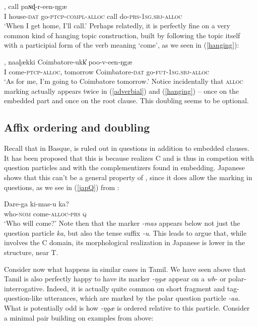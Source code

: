 \documentclass[output=paper, modfonts, nonflat]{langsci/langscibook}
\begin{document}
\ea\label{adverbial}
, call paɴɖ-r-een-ŋgæ\\ 
{} I house-\textsc{dat}{} go-\textsc{ptcp}-\textsc{compl}-\textsc{alloc} call do-\textsc{prs}-\textsc{1sg}.\textsc{sbj}-\textsc{alloc}\\ 
\glt `When I get home, I'll call.'
\z
%
Perhaps relatedly, it is perfectly fine on a very common kind of
hanging topic construction, built by following the topic itself with a
participial form of the verb meaning `come', as we seen in
(\ref{hanging}):

\ea\label{hanging}
, naaɭækki Coimbatore-ukk\U{} poo-v-een-ŋgæ\\
{} I come-\textsc{ptcp}-\textsc{alloc}, tomorrow Coimbatore-\textsc{dat}{}
go-\textsc{fut}-\textsc{1sg}.\textsc{sbj}-\textsc{alloc}\\ 
\glt `As for me, I'm going to Coimbatore tomorrow.'
\z
%
Notice incidentally that \textsc{alloc}{} marking actually appears twice in
(\ref{adverbial}) and (\ref{hanging}) -- once on the embedded part
and once on the root clause. This doubling seems to be optional. 


\subsection{Affix ordering and doubling}\label{sec:orderdoub}\largerpage
Recall that in Basque, \allagr{} is ruled out in questions in addition
to embedded clauses. It has been proposed that this is because
\allagr{} realizes C and is thus in competion with question particles
and with the complementizers found in embedding.  Japanese shows that
this can't be a general property of \allagr, since it does allow the
marking in questions, as we see in (\ref{japQ}) from
\citet{miyagawa:2017}:

\ea\label{japQ}\gll Dare-ga ki-mas-u ka?\\
who-\textsc{nom}{} come-\textsc{alloc}-\textsc{prs}{} \textsc{q}\\
\glt `Who will come?'
\z
%
Note then that the \allagr{} marker \textit{-mas} appears below not
just the question particle \textit{ka}, but also the tense suffix
\textit{-u}. This leads \citet{miyagawa:2017} to argue that, while
\allagr{} involves the C domain, its morphological realization in
Japanese is lower in the structure, near T.

Consider now what happens in similar cases in Tamil.  We have seen
above that Tamil is also perfectly happy to have its \allagr{} marker
\textit{-ŋgæ} appear on a \textit{wh}- or polar-interrogative.
Indeed, it is actually quite common on short fragment and
tag-question-like utterances, which are marked by the polar question
particle \textit{-aa}.  What is potentially odd is how \textit{-ŋgæ}
is ordered relative to this particle.  Consider a minimal pair
building on examples from above:\largerpage[2]
\end{document}
